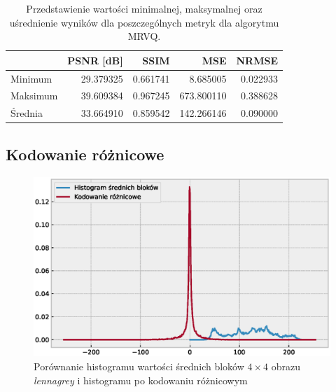 \documentclass{article}
\begin{document}
\begin{table}[H]
\centering
\begin{tabular}{@{}lrrrr@{}}
\toprule
         & PSNR {[}dB{]} & SSIM  & MSE     & NRMSE \\ \midrule
Minimum  &  29.379325 &  0.661741 &    8.685005 &  0.022933 \\
Maksimum &  39.609384 &  0.967245 &  673.800110 &  0.388628 \\
Średnia  &  33.664910 &  0.859542 &  142.266146 &  0.090000 \\
\bottomrule
\end{tabular}
\caption{Przedstawienie wartości minimalnej, maksymalnej oraz uśrednienie wyników dla poszczególnych metryk dla algorytmu MRVQ.}
\label{tab:mrvq_summary}
\end{table}


\FloatBarrier

\subsection{Kodowanie różnicowe}

\begin{figure}[H]
  \centering
  \includegraphics[width=.9\linewidth]{images/differential_encoding_histogram_image.eps}  
    \caption{Porównanie histogramu wartości średnich bloków $4\times4$ obrazu \emph{lennagrey} i histogramu po kodowaniu różnicowym}
  \label{fig:de_histogram_image}
\end{figure}
\end{document}
